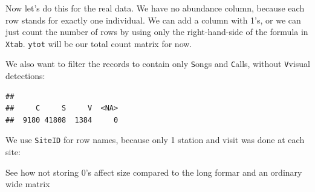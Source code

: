 \documentclass[12pt,]{book}
\newenvironment{Shaded}{\begin{snugshade}}{\end{snugshade}}
\newcommand{\CommentTok}[1]{\textcolor[rgb]{0.56,0.35,0.01}{\textit{#1}}}
\newcommand{\DataTypeTok}[1]{\textcolor[rgb]{0.13,0.29,0.53}{#1}}
\newcommand{\KeywordTok}[1]{\textcolor[rgb]{0.13,0.29,0.53}{\textbf{#1}}}
\newcommand{\NormalTok}[1]{#1}
\newcommand{\OperatorTok}[1]{\textcolor[rgb]{0.81,0.36,0.00}{\textbf{#1}}}
\newcommand{\StringTok}[1]{\textcolor[rgb]{0.31,0.60,0.02}{#1}}
\begin{document}
Now let's do this for the real data. We have no abundance column, because
each row stands for exactly one individual. We can add a column with 1's,
or we can just count the number of rows by using only the right-hand-side of the
formula in \texttt{Xtab}. \texttt{ytot} will be our total count matrix for now.

We also want to filter the records to contain only \texttt{S}ongs and \texttt{C}alls, without
\texttt{V}visual detections:

\begin{Shaded}
\end{Shaded}

\begin{verbatim}
## 
##     C     S     V  <NA> 
##  9180 41808  1384     0
\end{verbatim}

We use \texttt{SiteID} for row names, because only 1 station and visit was done at each site:

\begin{Shaded}
\end{Shaded}

See how not storing 0's affect size compared to the long formar and an ordinary wide matrix

\begin{Shaded}
\end{Shaded}
\end{document}
